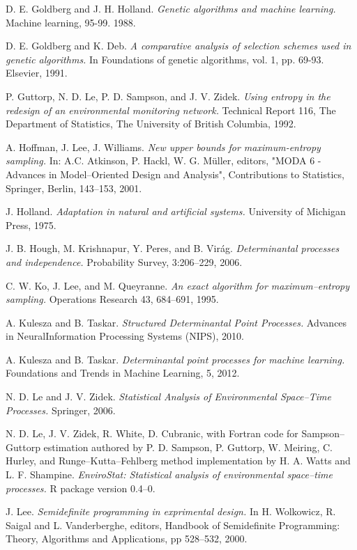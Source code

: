 \documentclass[]{interact}
\theoremstyle{plain}%
\theoremstyle{definition}
\theoremstyle{remark}
\begin{document}
\begin{thebibliography}{99}
D. E. Goldberg and J. H. Holland. {\em Genetic algorithms and machine learning.} Machine learning, 95-99. 1988.

D. E. Goldberg and K. Deb. {\em A comparative analysis of selection schemes used in genetic algorithms.} In Foundations of genetic algorithms, vol. 1, pp. 69-93. Elsevier, 1991.

P. Guttorp, N. D. Le, P. D. Sampson, and J. V. Zidek. {\em Using entropy in the redesign of an environmental monitoring network.} Technical Report 116, The Department of Statistics, The University of British Columbia, 1992.

A. Hoffman, J. Lee, J. Williams. {\em New upper bounds for maximum-entropy sampling.} In: A.C. Atkinson, P. Hackl, W. G. Müller, editors, "MODA 6 - Advances in Model--Oriented Design and Analysis", Contributions to Statistics, Springer, Berlin, 143--153, 2001.

J. Holland. {\em Adaptation in natural and artificial systems.} University of Michigan Press, 1975.

J. B. Hough, M. Krishnapur, Y. Peres, and B. Virág. {\em Determinantal processes
and independence.} Probability Survey, 3:206–229, 2006.

C. W. Ko, J. Lee, and M. Queyranne. {\em An exact algorithm for maximum--entropy
sampling.} Operations Research 43, 684–691, 1995.

A. Kulesza and B. Taskar. {\em Structured Determinantal Point Processes.} Advances in NeuralInformation Processing Systems (NIPS), 2010.

A. Kulesza and B. Taskar. {\em Determinantal point processes for machine learning.} Foundations and Trends in Machine Learning, 5, 2012.

N. D. Le and J. V. Zidek. {\em Statistical Analysis of Environmental Space--Time Processes.} Springer, 2006.

N. D. Le, J. V. Zidek, R. White, D. Cubranic, with Fortran code for Sampson--Guttorp estimation authored by P. D. Sampson, P. Guttorp, W. Meiring, C. Hurley, and Runge--Kutta--Fehlberg method implementation by H. A. Watts and L. F. Shampine. {\em EnviroStat: Statistical analysis of environmental space--time processes.} R package version 0.4--0.

J. Lee. {\em Semidefinite programming in exprimental design.} In H. Wolkowicz, R. Saigal and L. Vanderberghe, editors, Handbook of Semidefinite Programming: Theory, Algorithms and Applications, pp 528--532, 2000.


\end{thebibliography}
\end{document}
